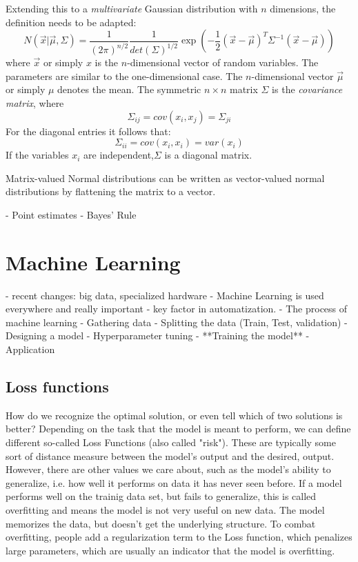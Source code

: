 \documentclass[twoside,12pt,a4paper]{report}
\begin{document}
Extending this to a \textit{multivariate} Gaussian distribution with $n$ dimensions, the definition needs to be adapted:
$$N(\vec{x} | \vec{\mu}, \Sigma) = \frac{1}{(2\pi)^{n/2}} \frac{1}{det(\Sigma)^{1/2}} \exp\left(-\frac{1}{2} (\vec{x} - \vec{\mu})^T \Sigma ^{-1} (\vec{x} - \vec{\mu})\right)$$
where $\vec{x}$ or simply $x$ is the $n$-dimensional vector of random variables. The parameters are similar to the one-dimensional case. The $n$-dimensional vector $\vec{\mu}$ or simply $\mu$ denotes the mean. The symmetric $n \times n$ matrix $\Sigma$ is the \textit{covariance matrix}, where
$$ \Sigma_{ij} =  cov(x_i, x_j) = \Sigma_{ji}$$
For the diagonal entries it follows that:
$$\Sigma_{ii} = cov(x_i,x_i) = var(x_i)$$
If the variables $x_i$ are independent,$\Sigma$ is a diagonal matrix.

Matrix-valued Normal distributions can be written as vector-valued normal distributions by flattening the matrix to a vector.

\begin{markdown}
- Point estimates
- Bayes' Rule
\end{markdown}

\section{Machine Learning}
\begin{markdown}
- recent changes: big data, specialized hardware
- Machine Learning is used everywhere and really important
	- key factor in automatization.
- The process of machine learning
	- Gathering data
		- Splitting the data (Train, Test, validation)
	- Designing a model
		- Hyperparameter tuning
	- **Training the model**
	- Application
	
\subsection{Loss functions}
How do we recognize the optimal solution, or even tell which of two solutions is better?
Depending on the task that the model is meant to perform, we can define different so-called Loss Functions (also called "risk"). These are typically some sort of distance measure between the model's output and the desired, output.
However, there are other values we care about, such as the model's ability to generalize, i.e. how well it performs on data it has never seen before. If a model performs well on the trainig data set, but fails to generalize, this is called overfitting and means the model is not very useful on new data. The model memorizes the data, but doesn't get the underlying structure. To combat overfitting, people add a regularization term to the Loss function, which penalizes large parameters, which are usually an indicator that the model is overfitting.

\end{markdown}
\end{document}

